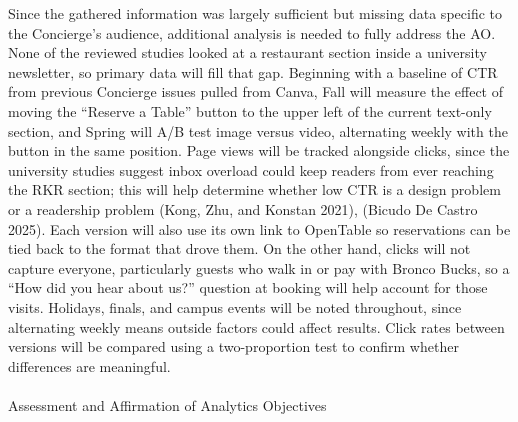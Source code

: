 \documentclass[
  12pt,
  letterpaper,
  DIV=11,
  numbers=noendperiod]{scrartcl}
\makeatletter
\let\oldparagraph\paragraph
\renewcommand{\paragraph}{
    \@ifstar
      \xxxParagraphStar
      \xxxParagraphNoStar
  }
\newcommand{\xxxParagraphStar}[1]{\oldparagraph*{#1}\mbox{}}
\newcommand{\xxxParagraphNoStar}[1]{\oldparagraph{#1}\mbox{}}
\makeatother
\begin{document}
Since the gathered information was largely sufficient but missing data
specific to the Concierge's audience, additional analysis is needed to
fully address the AO. None of the reviewed studies looked at a
restaurant section inside a university newsletter, so primary data will
fill that gap. Beginning with a baseline of CTR from previous Concierge
issues pulled from Canva, Fall will measure the effect of moving the
``Reserve a Table'' button to the upper left of the current text-only
section, and Spring will A/B test image versus video, alternating weekly
with the button in the same position. Page views will be tracked
alongside clicks, since the university studies suggest inbox overload
could keep readers from ever reaching the RKR section; this will help
determine whether low CTR is a design problem or a readership problem
(Kong, Zhu, and Konstan 2021), (Bicudo De Castro 2025). Each version
will also use its own link to OpenTable so reservations can be tied back
to the format that drove them. On the other hand, clicks will not
capture everyone, particularly guests who walk in or pay with Bronco
Bucks, so a ``How did you hear about us?'' question at booking will help
account for those visits. Holidays, finals, and campus events will be
noted throughout, since alternating weekly means outside factors could
affect results. Click rates between versions will be compared using a
two-proportion test to confirm whether differences are meaningful.

\paragraph{Assessment and Affirmation of Analytics
Objectives}\label{assessment-and-affirmation-of-analytics-objectives}
\end{document}
